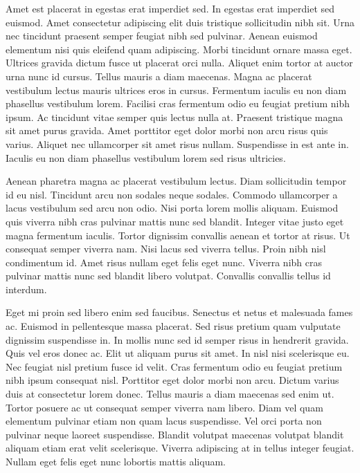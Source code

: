 \documentclass[11pt,a4paper]{article}
\begin{document}
Amet est placerat in egestas erat imperdiet sed. In egestas erat imperdiet sed euismod. Amet consectetur adipiscing elit duis tristique sollicitudin nibh sit. Urna nec tincidunt praesent semper feugiat nibh sed pulvinar. Aenean euismod elementum nisi quis eleifend quam adipiscing. Morbi tincidunt ornare massa eget. Ultrices gravida dictum fusce ut placerat orci nulla. Aliquet enim tortor at auctor urna nunc id cursus. Tellus mauris a diam maecenas. Magna ac placerat vestibulum lectus mauris ultrices eros in cursus. Fermentum iaculis eu non diam phasellus vestibulum lorem. Facilisi cras fermentum odio eu feugiat pretium nibh ipsum. Ac tincidunt vitae semper quis lectus nulla at. Praesent tristique magna sit amet purus gravida. Amet porttitor eget dolor morbi non arcu risus quis varius. Aliquet nec ullamcorper sit amet risus nullam. Suspendisse in est ante in. Iaculis eu non diam phasellus vestibulum lorem sed risus ultricies.

Aenean pharetra magna ac placerat vestibulum lectus. Diam sollicitudin tempor id eu nisl. Tincidunt arcu non sodales neque sodales. Commodo ullamcorper a lacus vestibulum sed arcu non odio. Nisi porta lorem mollis aliquam. Euismod quis viverra nibh cras pulvinar mattis nunc sed blandit. Integer vitae justo eget magna fermentum iaculis. Tortor dignissim convallis aenean et tortor at risus. Ut consequat semper viverra nam. Nisi lacus sed viverra tellus. Proin nibh nisl condimentum id. Amet risus nullam eget felis eget nunc. Viverra nibh cras pulvinar mattis nunc sed blandit libero volutpat. Convallis convallis tellus id interdum.

Eget mi proin sed libero enim sed faucibus. Senectus et netus et malesuada fames ac. Euismod in pellentesque massa placerat. Sed risus pretium quam vulputate dignissim suspendisse in. In mollis nunc sed id semper risus in hendrerit gravida. Quis vel eros donec ac. Elit ut aliquam purus sit amet. In nisl nisi scelerisque eu. Nec feugiat nisl pretium fusce id velit. Cras fermentum odio eu feugiat pretium nibh ipsum consequat nisl. Porttitor eget dolor morbi non arcu. Dictum varius duis at consectetur lorem donec. Tellus mauris a diam maecenas sed enim ut. Tortor posuere ac ut consequat semper viverra nam libero. Diam vel quam elementum pulvinar etiam non quam lacus suspendisse. Vel orci porta non pulvinar neque laoreet suspendisse. Blandit volutpat maecenas volutpat blandit aliquam etiam erat velit scelerisque. Viverra adipiscing at in tellus integer feugiat. Nullam eget felis eget nunc lobortis mattis aliquam.
\end{document}
